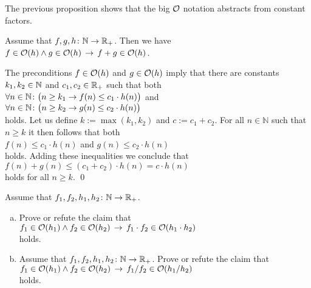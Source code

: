 \remark 
The previous proposition shows that the big $\mathcal{O}$ notation abstracts
from constant factors. 

\begin{Proposition}
Assume that $f,g,h \colon {\mathbb N} \rightarrow {{\mathbb R}_+}$. Then we have 
\\[0.2cm]
\hspace*{1.3cm}
$f \in \mathcal{O}(h) \wedge g \in \mathcal{O}(h) \,\rightarrow\, f + g \in \mathcal{O}(h)$.
\end{Proposition}

\proof
The preconditions $f \in \mathcal{O}(h)$ and $g \in \mathcal{O}(h)$ imply that there are constants $k_1,k_2\in {\mathbb N}$
and $c_1,c_2\in {\mathbb R}_+$ such that both \\[0.2cm]
\hspace*{1.3cm} 
$\forall n \in {\mathbb N} \colon \bigl( n \geq k_1 \rightarrow f(n) \leq c_1 \cdot h(n)\bigr)$ 
\quad and
\\[0.2cm]
\hspace*{1.3cm} 
$\forall n \in {\mathbb N} \colon\bigl( n \geq k_2 \rightarrow g(n) \leq c_2 \cdot h(n)\bigr)$
\\[0.2cm]
holds.  Let us define $k := \max(k_1,k_2)$ and $c:= c_1 + c_2$.  For all $n \in \mathbb{N}$ such
that $n \geq k$ it then follows that both
\\[0.2cm]
\hspace*{1.3cm}
 $f(n) \leq c_1 \cdot h(n)$ \quad and \quad  $g(n) \leq c_2 \cdot h(n)$
\\[0.2cm]
holds.  Adding these inequalities we conclude that 
\\[0.2cm]
\hspace*{1.3cm} $f(n) + g(n) \leq (c_1 + c_2) \cdot h(n) = c \cdot h(n)$
\\[0.2cm]
holds for all $n \geq k$.
\qed

\exercise
Assume that $f_1,f_2,h_1,h_2 \colon {\mathbb N} \rightarrow {{\mathbb R}_+}$.
\begin{enumerate}[(a)]
\item Prove or refute the claim that 
      \\[0.2cm]
      \hspace*{1.3cm}
      $f_1 \in \mathcal{O}(h_1) \wedge f_2 \in \mathcal{O}(h_2) \,\rightarrow\, f_1 \cdot f_2 \in \mathcal{O}(h_1 \cdot h_2)$
      \\[0.2cm]
      holds.  
\item Assume that $f_1,f_2,h_1,h_2 \colon {\mathbb N} \rightarrow {{\mathbb R}_+}$.  Prove or refute the claim that 
      \\[0.2cm]
      \hspace*{1.3cm}
      $f_1 \in \mathcal{O}(h_1) \wedge f_2 \in \mathcal{O}(h_2) \,\rightarrow\, f_1 / f_2 \in \mathcal{O}(h_1 / h_2)$
      \\[0.2cm]
      holds.  \eoxs
\end{enumerate}

